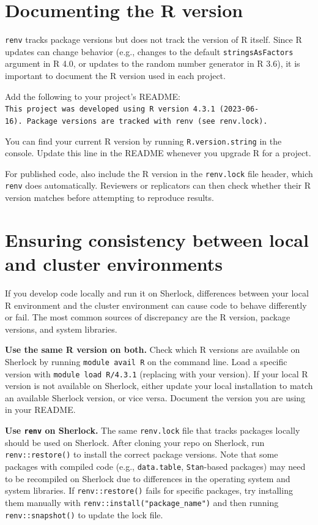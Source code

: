 \documentclass[
]{book}
\begin{document}
\section{Documenting the R version}\label{documenting-the-r-version}

\texttt{renv} tracks package versions but does not track the version of R itself. Since R updates can change behavior (e.g., changes to the default \texttt{stringsAsFactors} argument in R 4.0, or updates to the random number generator in R 3.6), it is important to document the R version used in each project.

Add the following to your project's README: \texttt{This\ project\ was\ developed\ using\ R\ version\ 4.3.1\ (2023-06-16).\ Package\ versions\ are\ tracked\ with\ renv\ (see\ renv.lock).}

You can find your current R version by running \texttt{R.version.string} in the console. Update this line in the README whenever you upgrade R for a project.

For published code, also include the R version in the \texttt{renv.lock} file header, which \texttt{renv} does automatically. Reviewers or replicators can then check whether their R version matches before attempting to reproduce results.

\section{Ensuring consistency between local and cluster environments}\label{ensuring-consistency-between-local-and-cluster-environments}

If you develop code locally and run it on Sherlock, differences between your local R environment and the cluster environment can cause code to behave differently or fail. The most common sources of discrepancy are the R version, package versions, and system libraries.

\textbf{Use the same R version on both.} Check which R versions are available on Sherlock by running \texttt{module\ avail\ R} on the command line. Load a specific version with \texttt{module\ load\ R/4.3.1} (replacing with your version). If your local R version is not available on Sherlock, either update your local installation to match an available Sherlock version, or vice versa. Document the version you are using in your README.

\textbf{Use \texttt{renv} on Sherlock.} The same \texttt{renv.lock} file that tracks packages locally should be used on Sherlock. After cloning your repo on Sherlock, run \texttt{renv::restore()} to install the correct package versions. Note that some packages with compiled code (e.g., \texttt{data.table}, \texttt{Stan}-based packages) may need to be recompiled on Sherlock due to differences in the operating system and system libraries. If \texttt{renv::restore()} fails for specific packages, try installing them manually with \texttt{renv::install("package\_name")} and then running \texttt{renv::snapshot()} to update the lock file.
\end{document}
